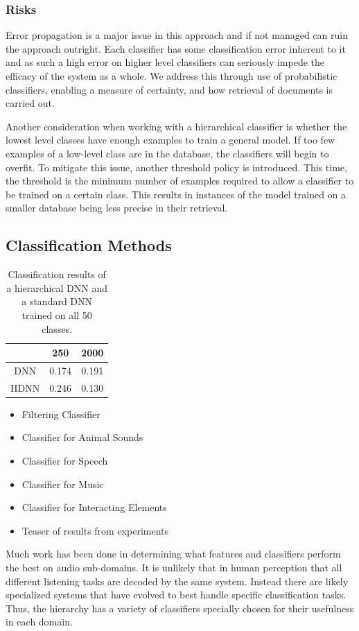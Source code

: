 \subsubsection{Risks}
Error propagation is a major issue in this approach and if not managed can ruin the approach outright. Each classifier has some classification error inherent to it and as such a high error on higher level classifiers can seriously impede the efficacy of the system as a whole. We address this through use of probabilistic classifiers, enabling a measure of certainty, and how retrieval of documents is carried out.

Another consideration when working with a hierarchical classifier is whether the lowest level classes have enough examples to train a general model. If too few examples of a low-level class are in the database, the classifiers will begin to overfit. To mitigate this issue, another threshold policy is introduced. This time, the threshold is the minimum number of examples required to allow a classifier to be trained on a certain class. This results in instances of the model trained on a smaller database being less precise in their retrieval.

\subsection{Classification Methods}

\begin{table}[t]
    \centering
    \begin{tabular}{ccc}
         & 250   & 2000  \\ \hline
    DNN  & 0.174 & 0.191 \\
    HDNN & 0.246 & 0.130
    \end{tabular}
    \caption{Classification results of a hierarchical DNN and a standard DNN trained on all 50 classes.}
    \label{tab:classifier}
\end{table}

\begin{itemize}
    \item Filtering Classifier
    \item Classifier for Animal Sounds
    \item Classifier for Speech
    \item Classifier for Music
    \item Classifier for Interacting Elements
    \item Teaser of results from experiments
\end{itemize}
Much work has been done in determining what features and classifiers perform the best on audio sub-domains. It is unlikely that in human perception that all different listening tasks are decoded by the same system. Instead there are likely specialized systems that have evolved to best handle specific classification tasks. Thus, the hierarchy has a variety of classifiers specially chosen for their usefulness in each domain.


